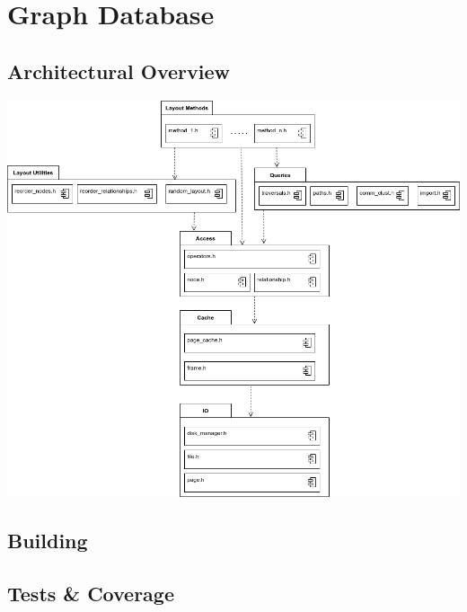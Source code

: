 \section{Graph Database}

\subsection{Architectural Overview}
\hspace{-2cm}\includegraphics[keepaspectratio,width=1.2\textwidth, height=.7\textheight]{img/overview.png}



\subsection{Building}

\subsection{Tests \& Coverage}




